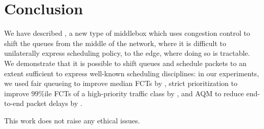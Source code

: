 \section{Conclusion}\label{s:concl}
We have described \name, a new type of middlebox which uses congestion control to shift the queues from the middle of the network, where it is difficult to unilaterally express scheduling policy, to the edge, where doing so is tractable.
We demonstrate that it is possible to shift queues and schedule packets to an extent sufficient to express well-known scheduling disciplines: in our experiments, we used fair queueing to improve median FCTs by \overviewBenefitsBundlerMedianImprovement, strict prioritization to improve $99$\%ile FCTs of a high-priority traffic class by \strictPrioImprovement, and AQM to reduce end-to-end packet delays by \delaysImprovement.

 This work does not raise any ethical issues.
